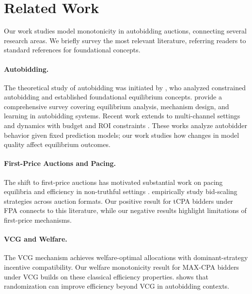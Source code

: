 
\section{Related Work}
\label{sec:related}

Our work studies model monotonicity in autobidding auctions, connecting several research areas. We briefly survey the most relevant literature, referring readers to standard references for foundational concepts.

\paragraph{Autobidding.} The theoretical study of autobidding was initiated by \citet{aggarwal2019autobidding}, who analyzed constrained autobidding and established foundational equilibrium concepts. \citet{aggarwal2024autobidding} provide a comprehensive survey covering equilibrium analysis, mechanism design, and learning in autobidding systems. Recent work extends to multi-channel settings \citep{deng2023multichannel} and dynamics with budget and ROI constraints \citep{lucier2024autobidders}. These works analyze autobidder behavior given fixed prediction models; our work studies how changes in model quality affect equilibrium outcomes.

\paragraph{First-Price Auctions and Pacing.} The shift to first-price auctions has motivated substantial work on pacing equilibria \citep{conitzer2022pacing} and efficiency in non-truthful settings \citep{liaw2023efficiency,liaw2024efficiency}. \citet{deng2024nonuniform} empirically study bid-scaling strategies across auction formats. Our positive result for tCPA bidders under FPA connects to this literature, while our negative results highlight limitations of first-price mechanisms.

\paragraph{VCG and Welfare.} The VCG mechanism \citep{vickrey1961counterspeculation,clarke1971multipart,groves1973incentives} achieves welfare-optimal allocations with dominant-strategy incentive compatibility. Our welfare monotonicity result for MAX-CPA bidders under VCG builds on these classical efficiency properties. \citet{mehta2022auction} shows that randomization can improve efficiency beyond VCG in autobidding contexts.

